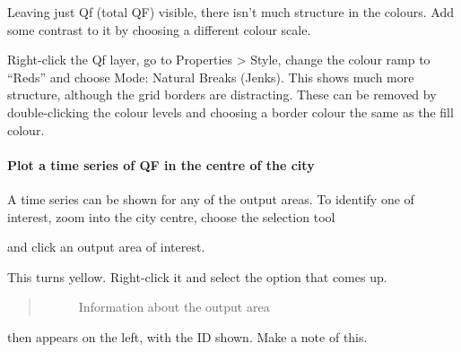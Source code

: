 \documentclass[letterpaper,10pt,english]{sphinxmanual}
\begin{document}
Leaving just Qf (total QF) visible, there isn’t much structure in the
colours. Add some contrast to it by choosing a different colour scale.

Right-click the Qf layer, go to Properties \textgreater{} Style, change the colour
ramp to “Reds” and choose Mode: Natural Breaks (Jenks). This shows much
more structure, although the grid borders are distracting. These can be
removed by double-clicking the colour levels and choosing a border
colour the same as the fill colour.

\begin{figure}[htbp]
\centering
\capstart

\noindent{}
\caption{}\label{\detokenize{Tutorials/LQF:id5}}\end{figure}


\paragraph{Plot a time series of QF in the centre of the city}
\label{\detokenize{Tutorials/LQF:plot-a-time-series-of-qf-in-the-centre-of-the-city}}
A time series can be shown for any of the output areas. To identify one
of interest, zoom into the city centre, choose the selection tool

\begin{figure}[htbp]
\centering
\capstart

\noindent{}
\caption{}\label{\detokenize{Tutorials/LQF:id6}}\end{figure}

and click an output area of
interest.

This turns yellow. Right-click it and select the option that comes up.
\begin{quote}

\begin{figure}[htbp]
\centering
\capstart

\noindent{}
\caption{Information about the output area}\label{\detokenize{Tutorials/LQF:id7}}\end{figure}
\end{quote}

then appears on the left, with the ID shown. Make a note of this.
\begin{quote}

\begin{figure}[htbp]
\centering
\capstart

\noindent{}
\caption{}\label{\detokenize{Tutorials/LQF:id8}}\end{figure}
\end{quote}
\end{document}
